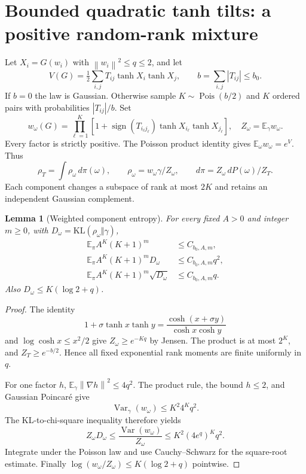 \documentclass[11pt]{article}
\newtheorem{lemma}[theorem]{Lemma}
\newcommand{\E}{\mathbb E}
\newcommand{\norm}[1]{\left\lVert #1\right\rVert}
\newcommand{\KL}{\mathrm{KL}}
\begin{document}
\section{Bounded quadratic tanh tilts: a positive random-rank mixture}
\label{sec:mixture}
Let $X_i=G(w_i)$ with $\norm{w_i}^2\le q\le2$, and let
\[
 V(G)=\tfrac12\sum_{i,j}T_{ij}\tanh X_i\tanh X_j,
 \qquad b=\sum_{i,j}|T_{ij}|\le b_0.
\]
If $b=0$ the law is Gaussian. Otherwise sample $K\sim\operatorname{Pois}(b/2)$ and $K$ ordered pairs with probabilities $|T_{ij}|/b$. Set
\[
 w_\omega(G)=\prod_{\ell=1}^K
 [1+\operatorname{sign}(T_{i_\ell j_\ell})\tanh X_{i_\ell}\tanh X_{j_\ell}],
 \quad Z_\omega=\E_\gamma w_\omega.
\]
Every factor is strictly positive. The Poisson product identity gives $\E_\omega w_\omega=e^V$. Thus
\begin{equation}
 \rho_T=\int\rho_\omega\,d\pi(\omega),\qquad
 \rho_\omega=w_\omega\gamma/Z_\omega,\qquad
 d\pi=Z_\omega\,dP(\omega)/Z_T.
 \label{eq:mixture}
\end{equation}
Each component changes a subspace of rank at most $2K$ and retains an independent Gaussian complement.

\begin{lemma}[Weighted component entropy]
\label{lem:mixtureentropy}
For every fixed $A>0$ and integer $m\ge0$, with $D_\omega=\KL(\rho_\omega\Vert\gamma)$,
\begin{align*}
 \E_\pi A^K(K+1)^m&\le C_{b_0,A,m},\\
 \E_\pi A^K(K+1)^mD_\omega&\le C_{b_0,A,m}q^2,\\
 \E_\pi A^K(K+1)^m\sqrt{D_\omega}&\le C_{b_0,A,m}q.
\end{align*}
Also $D_\omega\le K(\log2+q)$.
\end{lemma}
\begin{proof}
The identity
\[
 1+\sigma\tanh x\tanh y=\frac{\cosh(x+\sigma y)}{\cosh x\cosh y}
\]
and $\log\cosh x\le x^2/2$ give $Z_\omega\ge e^{-Kq}$ by Jensen. The product is at most $2^K$, and $Z_T\ge e^{-b/2}$. Hence all fixed exponential rank moments are finite uniformly in $q$.

For one factor $h$, $\E_\gamma\norm{\nabla h}^2\le4q^2$. The product rule, the bound $h\le2$, and Gaussian Poincar\'e give
\[
 \operatorname{Var}_\gamma(w_\omega)\le K^2 4^Kq^2.
\]
The KL-to-chi-square inequality therefore yields
\[
 Z_\omega D_\omega\le
 \frac{\operatorname{Var}(w_\omega)}{Z_\omega}
 \le K^2(4e^q)^Kq^2.
\]
Integrate under the Poisson law and use Cauchy--Schwarz for the square-root estimate. Finally $\log(w_\omega/Z_\omega)\le K(\log2+q)$ pointwise.
\end{proof}
\end{document}
